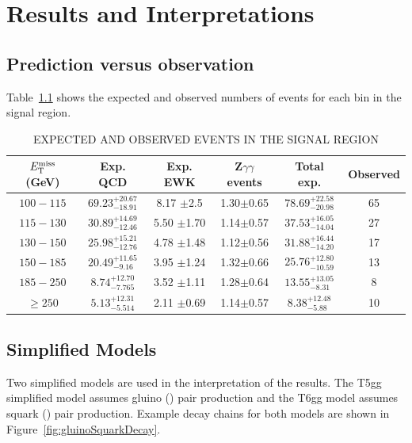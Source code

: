 \chapter{Results and Interpretations}
\label{chap:Results}

\section{Prediction versus observation}
\label{sec:fullCount}
Table~\ref{tab:ExpObs} shows the expected and observed numbers of events for each bin in the signal region.


\begin{table}[ht]
    \caption{EXPECTED AND OBSERVED EVENTS IN THE SIGNAL REGION}
    \centering
    \begin{tabular}{ |c|c|c|c|c|c|}
        \hline
        $E_{\mathrm{T}}^{\text{miss}}$ (GeV) & Exp. QCD & Exp. EWK &  Z$\gamma\gamma$ events  &Total exp. & Observed \\ [0.5ex]
        \hline
        $100 - 115$ & ${69.23}^{+20.67}_{-18.91}$ & 8.17 $\pm$2.5  & 1.30$\pm$0.65 & ${ 78.69 }^{+ 22.58 }_{- 20.98 }$ & 65  \\
        $115 - 130$ & ${30.89}^{+14.69}_{-12.46}$ & 5.50 $\pm$1.70 & 1.14$\pm$0.57 & ${ 37.53 }^{+ 16.05 }_{- 14.04 }$ & 27 \\
        $130 - 150$ & ${25.98}^{+15.21}_{-12.76}$ & 4.78 $\pm$1.48 & 1.12$\pm$0.56 & ${ 31.88 }^{+ 16.44 }_{- 14.20 }$ & 17 \\
        $150 - 185$ & ${20.49}^{+11.65}_{-9.16} $ & 3.95 $\pm$1.24 & 1.32$\pm$0.66 & ${ 25.76 }^{+ 12.80 }_{- 10.59 }$ & 13 \\
        $185 -  250$& ${8.74} ^{+12.70}_{-7.765}$ & 3.52 $\pm$1.11 & 1.28$\pm$0.64 & ${ 13.55 }^{+ 13.05 }_{- 8.31  }$ & 8  \\
        $\geq 250$  & ${5.13} ^{+12.31}_{-5.514}$ & 2.11 $\pm$0.69 & 1.14$\pm$0.57 & ${ 8.38  }^{+ 12.48 }_{- 5.88  }$ & 10 \\
        \hline
    \end{tabular}
    \label{tab:ExpObs}
\end{table}



\section{Simplified Models}
\label{sec:SimplifiedModels}

Two simplified models are used in the interpretation of the results. The T5gg simplified model assumes gluino (\gluino) pair production and the T6gg model assumes squark (\squark) pair production. Example decay chains for both models are shown in Figure~\ref{fig:gluinoSquarkDecay}.

